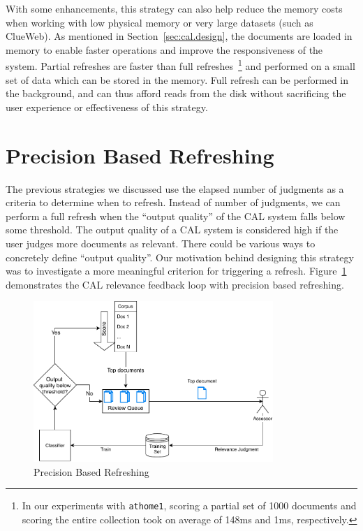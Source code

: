 With some enhancements, this strategy can also help reduce the memory costs
when working with low physical memory or very large datasets (such as ClueWeb).
As mentioned in Section~\ref{sec:cal.design}, the documents are loaded in memory
to enable faster operations and improve the responsiveness of the system.
Partial refreshes are faster than full refreshes~\footnote{In our experiments
    with \texttt{athome1},
scoring a partial set of 1000 documents and scoring the entire collection took
on average of 148ms and 1ms, respectively.} and performed on a small set of data which can be
stored in the memory. Full refresh can be performed in the background, and can
thus afford reads from the disk without sacrificing the user experience or
effectiveness of this strategy.

\section{Precision Based Refreshing}

The previous strategies we discussed use the elapsed number of judgments as
a criteria to determine when to refresh. Instead of number of judgments, we can
perform a full refresh when the ``output quality'' of the CAL system falls below
some threshold. The output quality of a CAL system is considered high if the
user judges more documents as relevant. There could be various ways to
concretely define ``output quality''. Our motivation behind designing this
strategy was to investigate a more meaningful criterion for triggering a
refresh.
Figure~\ref{fig:prec_flow} demonstrates the CAL relevance feedback loop with
precision based refreshing.

\begin{figure}
 \centering 
 \includegraphics[width=0.81\textwidth]{talk_sigir/animation/prec.pdf}
 \caption{Precision Based Refreshing}
 \label{fig:prec_flow}
\end{figure}


